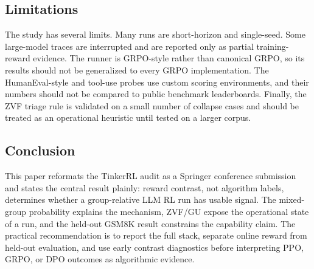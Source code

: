 \documentclass[runningheads,a4paper]{llncs}
\newcommand{\zvf}{\textsc{ZVF}}
\newcommand{\gu}{\textsc{GU}}
\begin{document}
\subsection{Limitations}

The study has several limits. Many runs are short-horizon and single-seed.
Some large-model traces are interrupted and are reported only as partial
training-reward evidence. The runner is GRPO-style rather than canonical GRPO,
so its results should not be generalized to every GRPO implementation. The
HumanEval-style and tool-use probes use custom scoring environments, and their
numbers should not be compared to public benchmark leaderboards. Finally, the
ZVF triage rule is validated on a small number of collapse cases and should be
treated as an operational heuristic until tested on a larger corpus.

\subsection{Conclusion}

This paper reformats the TinkerRL audit as a Springer conference submission and
states the central result plainly: reward contrast, not algorithm labels,
determines whether a group-relative LLM RL run has usable signal. The
mixed-group probability explains the mechanism, \zvf{}/\gu{} expose the
operational state of a run, and the held-out GSM8K result constrains the
capability claim. The practical recommendation is to report the full stack,
separate online reward from held-out evaluation, and use early contrast
diagnostics before interpreting PPO, GRPO, or DPO outcomes as algorithmic
evidence.



\end{document}
